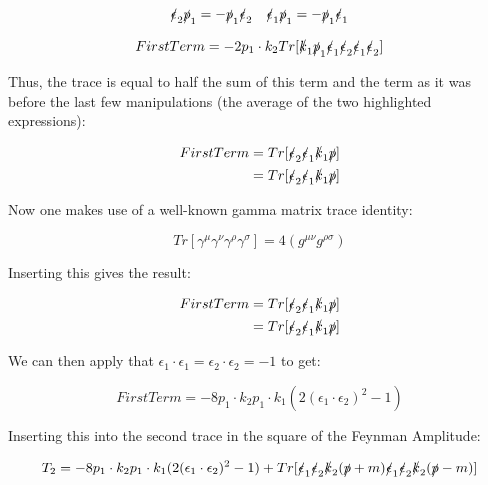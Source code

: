 \documentclass[a4]{article}
\begin{document}
    \[
        \slashed{\epsilon}_2 \slashed{p}_1 = - \slashed{p}_1 \slashed{\epsilon}_2 \quad \slashed{\epsilon}_1 \slashed{p}_1 = - \slashed{p}_1 \slashed{\epsilon}_1
    \]

    \begin{equation}
        First Term = -2 p_1 \cdot k_2 Tr [\slashed{k}_1 \slashed{p}_1 \slashed{\epsilon}_1 \slashed{\epsilon}_2 \slashed{\epsilon}_1 \slashed{\epsilon}_2]
    \end{equation}

    Thus, the trace is equal to half the sum of this term and the term as it was before the last few manipulations (the average of the two highlighted expressions):

    \begin{eqnarray}
        First Term = Tr [\slashed{\epsilon}_2 \slashed{\epsilon}_1 \slashed{k}_1 \slashed{p}] \\
        = Tr [\slashed{\epsilon}_2 \slashed{\epsilon}_1 \slashed{k}_1 \slashed{p}]
    \end{eqnarray}

    Now one makes use of a well-known gamma matrix trace identity:

    \begin{equation}
        Tr [\gamma^\mu \gamma^\nu \gamma^\rho \gamma^\sigma] = 4 (g^{\mu \nu} g^{\rho \sigma})
    \end{equation}

    Inserting this gives the result:

    \begin{eqnarray}
        First Term = Tr [\slashed{\epsilon}_2 \slashed{\epsilon}_1 \slashed{k}_1 \slashed{p}] \\
        = Tr [\slashed{\epsilon}_2 \slashed{\epsilon}_1 \slashed{k}_1 \slashed{p}]
    \end{eqnarray}

    We can then apply that $\epsilon_1 \cdot \epsilon_1 = \epsilon_2 \cdot \epsilon_2 = -1$ to get:

    \begin{equation}
        First Term = - 8 p_1 \cdot k_2 p_1 \cdot k_1 (2 (\epsilon_1 \cdot \epsilon_2)^2 - 1)
    \end{equation}

    Inserting this into the second trace in the square of the Feynman Amplitude:

    \begin{equation}
        T_2 = - 8 p_1 \cdot k_2 p_1 \cdot k_1 (2 (\epsilon_1 \cdot \epsilon_2)^2 - 1) + Tr [\slashed{\epsilon}_1 \slashed{\epsilon}_2 \slashed{k}_2 (\slashed{p} + m) \slashed{\epsilon}_1 \slashed{\epsilon}_2 \slashed{k}_2 (\slashed{p} - m)]
    \end{equation}
\end{document}
